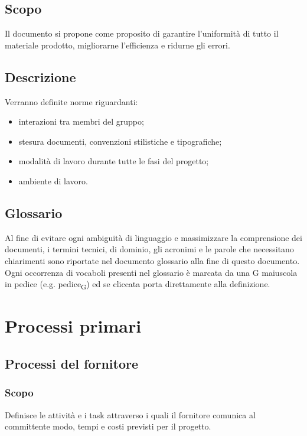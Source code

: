 \documentclass[12pt,a4paper]{article}
\begin{document}
\subsection{Scopo}
Il documento si propone come proposito di garantire l'uniformità di tutto il materiale prodotto, migliorarne l'efficienza e ridurne gli errori.

\subsection{Descrizione}
Verranno definite norme riguardanti:
\begin{itemize}
	\item interazioni tra membri del gruppo;
	\item stesura documenti, convenzioni stilistiche e tipografiche;
	\item modalità di lavoro durante tutte le fasi del progetto;
	\item ambiente di lavoro.
\end{itemize}

\subsection{Glossario}
Al fine di evitare ogni ambiguità di linguaggio e massimizzare la comprensione dei documenti, i termini tecnici, di dominio, gli acronimi e le parole che necessitano chiarimenti sono riportate nel documento glossario alla fine di questo documento. Ogni occorrenza di vocaboli presenti nel glossario è marcata da una G maiuscola in pedice (e.g. pedice\textsubscript{G}) ed se cliccata porta direttamente alla definizione.

\newpage

\section{Processi primari}

\subsection{Processi del fornitore}


\subsubsection{Scopo}
Definisce le attività e i task attraverso i quali il fornitore comunica al committente modo, tempi e costi previsti per il progetto.
\end{document}

